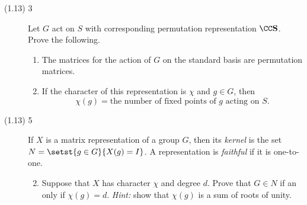 \documentclass{math174}
\date{Monday, February 25}
\author{}
\begin{document}
\begin{description}
\item[(1.13) 3] Let \(G\) act on \(S\) with corresponding permutation
  representation \(\CC \mathbf S\).  Prove the following.

  \begin{enumerate}
  \item The matrices for the action of \(G\) on the standard basis are
    permutation matrices.

    \begin{solution}

    \end{solution}

  \item If the character of this representation is \(\chi\) and
    \(g \in G\), then
    \[
      \chi(g) = \text{the number of fixed points of \(g\) acting on
        \(S\)}.
    \]

    \begin{solution}

    \end{solution}
  \end{enumerate}

\item[(1.13) 5] If \(X\) is a matrix representation of a group \(G\),
  then its \emph{kernel} is the set \(N = \setst{g \in G}{X(g) = I}\).
  A representation is \emph{faithful} if it is one-to-one.
  \begin{enumerate} \setcounter{enumi}{1}
  \item Suppose that \(X\) has character \(\chi\) and degree \(d\).
    Prove that \(G \in N\) if an only if \(\chi(g) = d\).
    \emph{Hint:} show that \(\chi(g)\) is a sum of roots of unity.

    \begin{solution}

    \end{solution}
  \end{enumerate}
\end{description}
\end{document}
